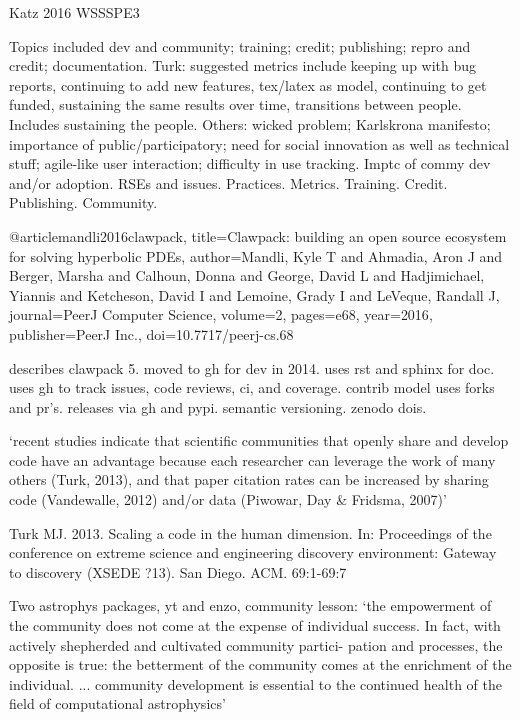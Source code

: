 \documentclass[12pt]{amsart}
\begin{document}
Katz 2016 WSSSPE3

Topics included dev and community; training; credit; publishing; repro and credit; documentation. Turk: suggested metrics include keeping up with bug reports, continuing to add new features, tex/latex as model, continuing to get funded, sustaining the same results over time, transitions between people. Includes sustaining the people. Others: wicked problem; Karlskrona manifesto; importance of public/participatory; need for social innovation as well as technical stuff; agile-like user interaction; difficulty in use tracking. Imptc of commy dev and/or adoption. RSEs and issues. Practices. Metrics. Training. Credit. Publishing. Community. 


@article{mandli2016clawpack,
  title={Clawpack: building an open source ecosystem for solving hyperbolic PDEs},
  author={Mandli, Kyle T and Ahmadia, Aron J and Berger, Marsha and Calhoun, Donna
    and George, David L and Hadjimichael, Yiannis and Ketcheson, David I and Lemoine,
    Grady I and LeVeque, Randall J},
  journal={PeerJ Computer Science},
  volume={2},
  pages={e68},
  year={2016},
  publisher={PeerJ Inc.},
  doi={10.7717/peerj-cs.68}
}

describes clawpack 5. moved to gh for dev in 2014. uses rst and sphinx for doc. uses gh to track issues, code reviews, ci, and coverage. contrib model uses forks and pr's. releases via gh and pypi. semantic versioning. zenodo dois.

`recent studies indicate that scientific communities that openly share and develop code have an advantage because each researcher can leverage the work of many others (Turk, 2013), and that paper citation rates can be increased by sharing code (Vandewalle, 2012) and/or data (Piwowar, Day \& Fridsma, 2007)'



 Turk MJ. 2013. Scaling a code in the human dimension. In: Proceedings of the conference on extreme science and engineering discovery environment: Gateway to discovery (XSEDE ?13). San Diego. ACM. 69:1-69:7 

Two astrophys packages, yt and enzo, community lesson: `the empowerment of the community does not come at the expense of individual success. In fact, with actively shepherded and cultivated community partici- pation and processes, the opposite is true: the betterment of the community comes at the enrichment of the individual. ... community development is essential to the continued health of the field of computational astrophysics'
\end{document}
